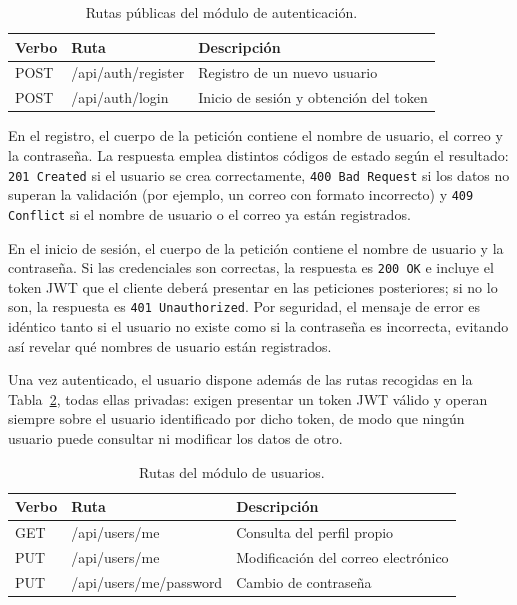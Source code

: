 \documentclass[12pt,a4paper,twoside,openright]{book}
\begin{document}
    \begin{table}[htbp]
        \centering
        \begin{tabular}{lll}
            \toprule
            \textbf{Verbo} & \textbf{Ruta} & \textbf{Descripción} \\
            \midrule
            POST & /api/auth/register & Registro de un nuevo usuario \\
            POST & /api/auth/login    & Inicio de sesión y obtención del token \\
            \bottomrule
        \end{tabular}
        \caption{Rutas públicas del módulo de autenticación.}
        \label{tab:api-auth}
    \end{table}

    En el registro, el cuerpo de la petición contiene el nombre de usuario, el
    correo y la contraseña. La respuesta emplea distintos códigos de estado según
    el resultado: \texttt{201 Created} si el usuario se crea correctamente,
    \texttt{400 Bad Request} si los datos no superan la validación (por ejemplo,
    un correo con formato incorrecto) y \texttt{409 Conflict} si el nombre de
    usuario o el correo ya están registrados.

    En el inicio de sesión, el cuerpo de la petición contiene el nombre de
    usuario y la contraseña. Si las credenciales son correctas, la respuesta es
    \texttt{200 OK} e incluye el token JWT que el cliente deberá presentar en
    las peticiones posteriores; si no lo son, la respuesta es
    \texttt{401 Unauthorized}. Por seguridad, el mensaje de error es idéntico
    tanto si el usuario no existe como si la contraseña es incorrecta, evitando
    así revelar qué nombres de usuario están registrados.

    Una vez autenticado, el usuario dispone además de las rutas recogidas en la
    Tabla~\ref{tab:api-users}, todas ellas privadas: exigen presentar un token
    JWT válido y operan siempre sobre el usuario identificado por dicho token,
    de modo que ningún usuario puede consultar ni modificar los datos de otro.

    \begin{table}[htbp]
        \centering
        \begin{tabular}{lll}
            \toprule
            \textbf{Verbo} & \textbf{Ruta} & \textbf{Descripción} \\
            \midrule
            GET & /api/users/me          & Consulta del perfil propio \\
            PUT & /api/users/me          & Modificación del correo electrónico \\
            PUT & /api/users/me/password & Cambio de contraseña \\
            \bottomrule
        \end{tabular}
        \caption{Rutas del módulo de usuarios.}
        \label{tab:api-users}
    \end{table}
\end{document}
